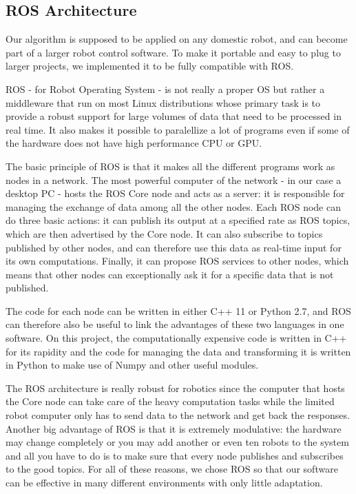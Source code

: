 \subsection{ROS Architecture}
Our algorithm is supposed to be applied on any domestic robot, and can become part of a larger robot control software. To make it portable and easy to plug to larger projects, we implemented it to be fully compatible with ROS.

ROS \cite{ROS} - for Robot Operating System - is not really a proper OS but rather a middleware that run on most Linux distributions whose primary task is to provide a robust support for large volumes of data that need to be processed in real time. It also makes it possible to paralellize a lot of programs even if some of the hardware does not have high performance CPU or GPU.

The basic principle of ROS is that it makes all the different programs work as nodes in a network. The most powerful computer of the network - in our case a desktop PC - hosts the ROS Core node and acts as a server: it is responsible for managing the exchange of data among all the other nodes. Each ROS node can do three basic actions: it can publish its output at a specified rate as ROS topics, which are then advertised by the Core node. It can also subscribe to topics published by other nodes, and can therefore use this data as real-time input for its own computations. Finally, it can propose ROS services to other nodes, which means that other nodes can exceptionally ask it for a specific data that is not published. 

The code for each node can be written in either C++ 11 or Python 2.7, and ROS can therefore also be useful to link the advantages of these two languages in one software. On this project, the computationally expensive code is written in C++ for its rapidity and the code for managing the data and transforming it is written in Python to make use of Numpy and other useful modules.

The ROS architecture is really robust for robotics since the computer that hosts the Core node can take care of the heavy computation tasks while the limited robot computer only has to send data to the network and get back the responses. Another big advantage of ROS is that it is extremely modulative: the hardware may change completely or you may add another or even ten robots to the system and all you have to do is to make sure that every node publishes and subscribes to the good topics. For all of these reasons, we chose ROS so that our software can be effective in many different environments with only little adaptation.

